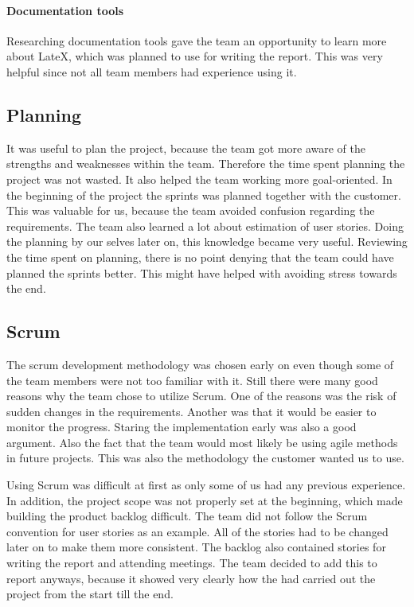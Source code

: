 \paragraph{Documentation tools}
Researching documentation tools gave the team an opportunity to learn more about LateX, which was planned to use for writing the report. This was very helpful since not all team members had experience using it. 

\subsection{Planning}

It was useful to plan the project, because the team got more aware of the strengths and weaknesses within the team. Therefore the time spent planning the project was not wasted. It also helped the team working more goal-oriented. In the beginning of the project the sprints was planned together with the customer. This was valuable for us, because the team avoided confusion regarding the requirements. The team also learned a lot about estimation of user stories. Doing the planning by our selves later on, this knowledge became very useful. Reviewing the time spent on planning, there is no point denying that the team could have planned the sprints better. This might have helped with avoiding stress towards the end.   

\subsection{Scrum}
The scrum development methodology was chosen early on even though some of the team members were not too familiar with it.
Still there were many good reasons why the team chose to utilize Scrum.
One of the reasons was the risk of sudden changes in the requirements.
Another was that it would be easier to monitor the progress. Staring the implementation early was also a good argument. Also the fact that the team would most likely be using agile methods in future projects. 
This was also the methodology the customer wanted us to use. 

Using Scrum was difficult at first as only some of us had any previous experience. 
In addition, the project scope was not properly set at the beginning, which made building the product backlog difficult. 
The team did not follow the Scrum convention for user stories as an example. 
All of the stories had to be changed later on to make them more consistent. 
The backlog also contained stories for writing the report and attending meetings.
The team decided to add this to report anyways, because it showed very clearly how the had carried out the project from the start till the end. 

